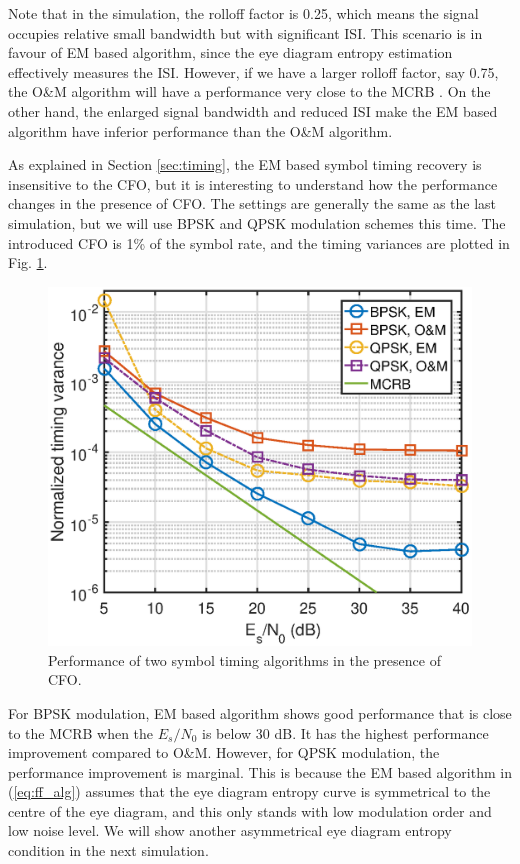 \documentclass[journal,comsoc,onecolumn, 12pt,draftclsnofoot]{IEEEtran}
\begin{document}
Note that in the simulation, the rolloff factor is 0.25, which means the signal occupies relative small bandwidth but with significant ISI.
This scenario is in favour of EM based algorithm, since the eye diagram entropy estimation effectively measures the ISI.
However, if we have a larger rolloff factor, say 0.75, the O\&M algorithm will have a performance very close to the MCRB \cite{mengali1997synchronization}.
% 
% 
On the other hand, the enlarged signal bandwidth and reduced ISI make the EM based algorithm have inferior performance than the O\&M algorithm.

As explained in Section \ref{sec:timing}, the EM based symbol timing recovery is insensitive to the CFO, but it is interesting to understand how the performance changes in the presence of CFO. 
The settings are generally the same as the last simulation, but we will use BPSK and QPSK modulation schemes this time.
The introduced CFO is 1\% of the symbol rate, and the timing variances are plotted in Fig. \ref{fig:timing_frq_per}.

\begin{figure}[ht]
\centering
\includegraphics[width=3 in]{pic/per_timing_frq.eps}
\caption{Performance of two symbol timing algorithms in the presence of CFO.}
\label{fig:timing_frq_per} 
\end{figure}  

For BPSK modulation, EM based algorithm shows good performance that is close to the MCRB when the \(E_s/N_0\) is below 30 dB.
It has the highest performance improvement compared to O\&M.
However, for QPSK modulation, the performance improvement is marginal.
This is because the EM based algorithm in (\ref{eq:ff_alg}) assumes that the eye diagram entropy curve is symmetrical to the centre of the eye diagram, and this only stands with low modulation order and low noise level.
We will show another asymmetrical eye diagram entropy condition in the next simulation. 
\end{document}
